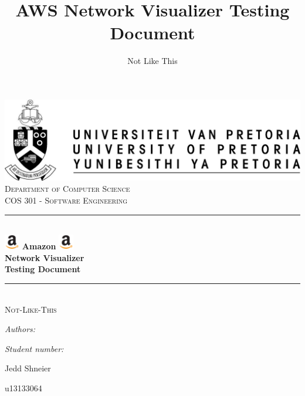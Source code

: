 \documentclass[hidelinks,a4paper,12pt]{article}
\author{Not Like This}
\title{AWS Network Visualizer Testing Document}
\newcommand{\HRule}{\rule{\linewidth}{0.5mm}}
\begin{document}
\setlength{\parskip}{6pt}

\begin{titlepage}

\begin{center}
\includegraphics[width=1\textwidth]{./images/up-logo.jpg}\\[0.4cm]    
\textsc{\LARGE Department of Computer Science}\\[1.5cm]
\textsc{\Large COS 301 - Software Engineering}\\[0.5cm]
\HRule \\[0.4cm]
\includegraphics[width=0.05\textwidth]{./images/logo.jpg} 
{ \huge \bfseries Amazon}
\includegraphics[width=0.05\textwidth]{./images/logo.jpg}\\[0.4cm] 
{ \huge \bfseries Network Visualizer}\\[0.4cm]
{ \huge \bfseries Testing Document}\\[0.4cm]
\HRule \\[0.4cm]
\textsc{\Large Not-Like-This}\\[0.5cm]
\begin{minipage}{0.4\textwidth}
\begin{flushleft} \large
\emph{Authors:}
\end{flushleft}
\end{minipage}
\begin{minipage}{0.4\textwidth}
\begin{flushright} \large
\emph{Student number:}
\end{flushright}
\end{minipage}

\begin{minipage}{0.4\textwidth}
\begin{flushleft} \large
Jedd {Shneier}
\end{flushleft}
\end{minipage}
\begin{minipage}{0.4\textwidth}
\begin{flushright} \large
\emph{}
u13133064
\end{flushright}
\end{minipage}


\end{center}
\end{titlepage}
\end{document}
